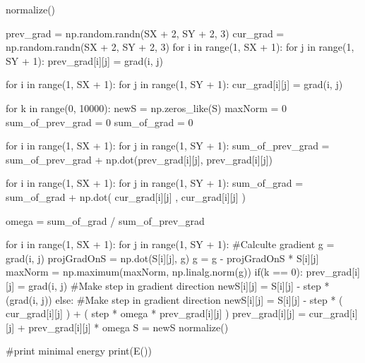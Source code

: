 \documentclass[ 12pt,x11names]{article}
\begin{document}
\begin{python}
normalize()

prev_grad =  np.random.randn(SX + 2, SY + 2, 3)
cur_grad = np.random.randn(SX + 2, SY + 2, 3)
for i in range(1, SX + 1):
    for j in range(1, SY + 1):
        prev_grad[i][j] = grad(i, j)

for i in range(1, SX + 1):
    for j in range(1, SY + 1):
        cur_grad[i][j] = grad(i,  j)


for k in range(0, 10000):
    newS = np.zeros_like(S)
    maxNorm = 0
    sum_of_prev_grad = 0
    sum_of_grad  =  0


    for i in range(1, SX + 1):
        for j in range(1, SY + 1):
            sum_of_prev_grad = sum_of_prev_grad +
            np.dot(prev_grad[i][j], prev_grad[i][j])

    for i in range(1, SX + 1):
        for j in range(1, SY + 1):
            sum_of_grad = sum_of_grad +
            np.dot( cur_grad[i][j] ,  cur_grad[i][j] )

    omega = sum_of_grad / sum_of_prev_grad

    for i in range(1, SX + 1):
        for j in range(1, SY + 1):
            #Calculte gradient
            g = grad(i,  j)
            projGradOnS = np.dot(S[i][j], g)
            g = g - projGradOnS * S[i][j]
            maxNorm = np.maximum(maxNorm, np.linalg.norm(g))
            if(k == 0):
                prev_grad[i][j] = grad(i, j)
                #Make step in gradient direction
                newS[i][j] = S[i][j] -
                step * (grad(i, j))
            else:
                #Make step in gradient direction
                newS[i][j] = S[i][j] - step * ( cur_grad[i][j] )
                + ( step * omega *  prev_grad[i][j] )
                prev_grad[i][j] =  cur_grad[i][j]  +
                prev_grad[i][j] * omega
    S = newS
    normalize()

#print minimal energy
print(E())
 \end{python}
\end{document}
